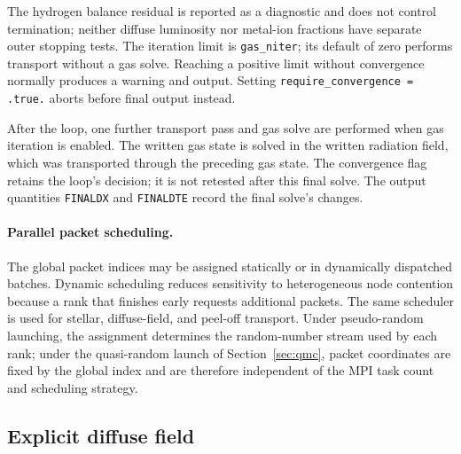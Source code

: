 \documentclass[twocolumn,linenumbers]{aastex702}
\newcommand{\code}[1]{\texttt{#1}}
\begin{document}
The hydrogen balance residual is reported as a diagnostic and does not
control termination; neither diffuse luminosity nor metal-ion fractions
have separate outer stopping tests. The iteration limit is
\code{gas\_niter}; its default of zero performs transport without a gas
solve. Reaching a positive limit without convergence normally produces a
warning and output. Setting \code{require\_convergence = .true.} aborts
before final output instead.

After the loop, one further transport pass and gas solve are performed
when gas iteration is enabled. The written gas state is solved in the
written radiation field, which was transported through the preceding gas
state. The convergence flag retains the loop's decision; it is not retested
after this final solve. The output quantities \code{FINALDX} and
\code{FINALDTE} record the final solve's changes.

\paragraph{Parallel packet scheduling.}  The global packet indices may be
assigned statically or in dynamically dispatched batches.  Dynamic scheduling
reduces sensitivity to heterogeneous node contention because a rank that
finishes early requests additional packets.  The same scheduler is used for
stellar, diffuse-field, and peel-off transport.  Under pseudo-random
launching, the assignment determines the random-number stream used by each
rank; under the quasi-random launch of Section~\ref{sec:qmc}, packet
coordinates are fixed by the global index and are therefore independent of
the MPI task count and scheduling strategy.

\subsection{Explicit diffuse field}
\label{sec:diffuse}
\end{document}
